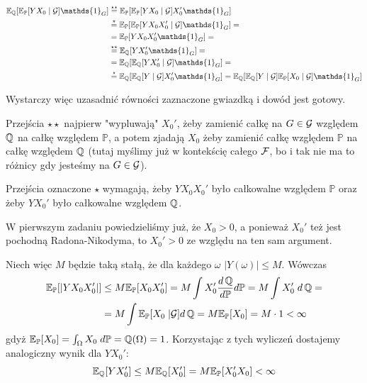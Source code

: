 \documentclass{article}
\newcommand{\E}{\mathbb{E}}
\renewcommand{\P}{\mathbb{P}}
\begin{document}
\begin{align*}
  \E_{\Q}[\E_{\P}[YX_0\;|\;\set{G}]\mathds{1}_G]&\overset{\star\star}{=}\E_{\P}[\E_{\P}[YX_0\;|\;\set{G}]X_0'\mathds{1}_G]\\
        &\overset{\star}{=}\E_{\P}[\E_{\P}[YX_0X_0'\;|\;\set{G}]\mathds{1}_G]=\\
        &=\E_{\P}[YX_0X_0'\mathds{1}_G]=\\
        &\overset{\star\star}{=}\E_{\Q}[YX_0'\mathds{1}_G]=\\
        &=\E_{\Q}[\E_{\Q}[YX_0'\;|\;\set{G}]\mathds{1}_G]=\\
        &\overset{\star}{=}\E_{\Q}[\E_{\Q}[Y\;|\;\set{G}]X_0'\mathds{1}_G]=\E_{\Q}[\E_{\Q}[Y\;|\;\set{G}]\E_{\P}[X_0\;|\;\set{G}]\mathds{1}_G]
\end{align*}

Wystarczy więc uzasadnić równości zaznaczone gwiazdką i dowód jest gotowy.

Przejścia $\star\star$ najpierw "wypluwają" $X_0'$, żeby zamienić całkę na $G\in\mathcal{G}$ względem $\operatorname{\mathbb{Q}}$ na całkę względem $\P$, a potem zjadają $X_0$ żeby zamienić całkę względem $\P$ na całkę względem $\operatorname{\mathbb{Q}}$ (tutaj myślimy już w kontekścię całego $\mathcal{F}$, bo i tak nie ma to różnicy gdy jesteśmy na $G\in\mathcal{G}$).

Przejścia oznaczone $\star$ wymagają, żeby $YX_0X_0'$ było całkowalne względem $\P$ oraz żeby $YX_0'$ było całkowalne względem $\operatorname{\mathbb{Q}}$. 

W pierwszym zadaniu powiedzieliśmy już, że $X_0>0$, a ponieważ $X_0'$ też jest pochodną Radona-Nikodyma, to $X_0'>0$ ze względu na ten sam argument.

Niech więc $M$ będzie taką stałą, że dla każdego $\omega$ $|Y(\omega)|\leq M$. Wówczas
\begin{align*}
  \E_{\P}[|YX_0X_0'|]&\leq M\E_{\P}[X_0X_0']=M\int X_0'\frac{d\Q}{d\P}d\P=M\int X_0'\;d\Q=\\
                     &=M\int\E_{\P}[X_0\;|\set{G}]d\Q=M\E_{\P}[X_0]=M\cdot 1<\infty
\end{align*}
gdyż $\E_{\P}[X_0]=\int_{\Omega}X_0\;d\P=\Q(\Omega)=1$. Korzystając z tych wyliczeń dostajemy analogiczny wynik dla $YX_0'$:
$$\E_{\Q}[YX_0']\leq M\E_{\Q}[X_0']=M\E_{\P}[X_0'X_0]<\infty$$
\bigskip
\end{document}
